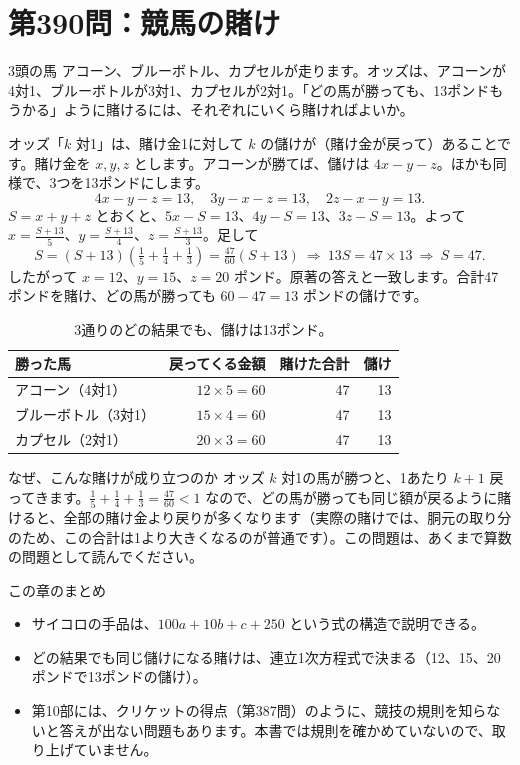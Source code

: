 \documentclass[a4paper,11pt,openany]{ltjsbook}
\begin{document}
\section{第390問：競馬の賭け}

3頭の馬 アコーン、ブルーボトル、カプセルが走ります。オッズは、アコーンが4対1、ブルーボトルが3対1、カプセルが2対1。「どの馬が勝っても、13ポンドもうかる」ように賭けるには、それぞれにいくら賭ければよいか。

オッズ「$k$ 対1」は、賭け金1に対して $k$ の儲けが（賭け金が戻って）あることです。賭け金を $x,y,z$ とします。アコーンが勝てば、儲けは $4x-y-z$。ほかも同様で、3つを13ポンドにします。
\[
4x-y-z=13,\quad 3y-x-z=13,\quad 2z-x-y=13 .
\]
$S=x+y+z$ とおくと、$5x-S=13$、$4y-S=13$、$3z-S=13$。よって $x=\tfrac{S+13}{5}$、$y=\tfrac{S+13}{4}$、$z=\tfrac{S+13}{3}$。足して
\[
S=(S+13)\left(\tfrac15+\tfrac14+\tfrac13\right)=\tfrac{47}{60}(S+13)
\ \Longrightarrow\ 13S=47\times13\ \Longrightarrow\ S=47 .
\]
したがって $x=12$、$y=15$、$z=20$ ポンド。原著の答えと一致します。合計47ポンドを賭け、どの馬が勝っても $60-47=13$ ポンドの儲けです。

\begin{table}[htbp]
\centering
\begin{tabular}{lrrr}
\toprule
勝った馬 & 戻ってくる金額 & 賭けた合計 & 儲け\\
\midrule
アコーン（4対1） & $12\times5=60$ & 47 & 13\\
ブルーボトル（3対1） & $15\times4=60$ & 47 & 13\\
カプセル（2対1） & $20\times3=60$ & 47 & 13\\
\bottomrule
\end{tabular}
\caption{3通りのどの結果でも、儲けは13ポンド。}
\end{table}

\begin{notebox}{なぜ、こんな賭けが成り立つのか}
オッズ $k$ 対1の馬が勝つと、1あたり $k+1$ 戻ってきます。$\tfrac15+\tfrac14+\tfrac13=\tfrac{47}{60}<1$ なので、どの馬が勝っても同じ額が戻るように賭けると、全部の賭け金より戻りが多くなります（実際の賭けでは、胴元の取り分のため、この合計は1より大きくなるのが普通です）。この問題は、あくまで算数の問題として読んでください。
\end{notebox}

\begin{pointbox}{この章のまとめ}
\begin{itemize}[leftmargin=*]
\item サイコロの手品は、$100a+10b+c+250$ という式の構造で説明できる。
\item どの結果でも同じ儲けになる賭けは、連立1次方程式で決まる（12、15、20ポンドで13ポンドの儲け）。
\item 第10部には、クリケットの得点（第387問）のように、競技の規則を知らないと答えが出ない問題もあります。本書では規則を確かめていないので、取り上げていません。
\end{itemize}
\end{pointbox}
\end{document}
